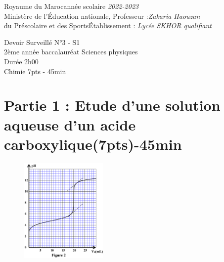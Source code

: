 \documentclass[12pt]{article}
\newcommand\headerMe[2]{\noindent{}#1\hfill#2}
\begin{document}
\headerMe{Royaume du Maroc}{année scolaire \emph{2022-2023}}\\
\headerMe{Ministère de l'Éducation nationale, }{  Professeur :\emph{Zakaria Haouzan}}\\
\headerMe{du Préscolaire et des Sports}{Établissement : \emph{Lycée SKHOR qualifiant}}\\
\begin{center}
Devoir Surveillé  N°3 - S1 \\
    2ème année baccalauréat Sciences physiques\\
Durée 2h00
\\
    \vspace{.2cm}
\hrulefill
\Large{Chimie 7pts - 45min}
\hrulefill\\

\end{center}

 \section*{Partie 1 : Etude d’une solution aqueuse d’un acide carboxylique\dotfill(7pts)-45min }


\begin{figure}
	\vspace{-2.4cm}
\begin{center}
  \includegraphics[width=0.38\textwidth]{./img/img00.png}
\end{center}
\end{figure}
\end{document}
